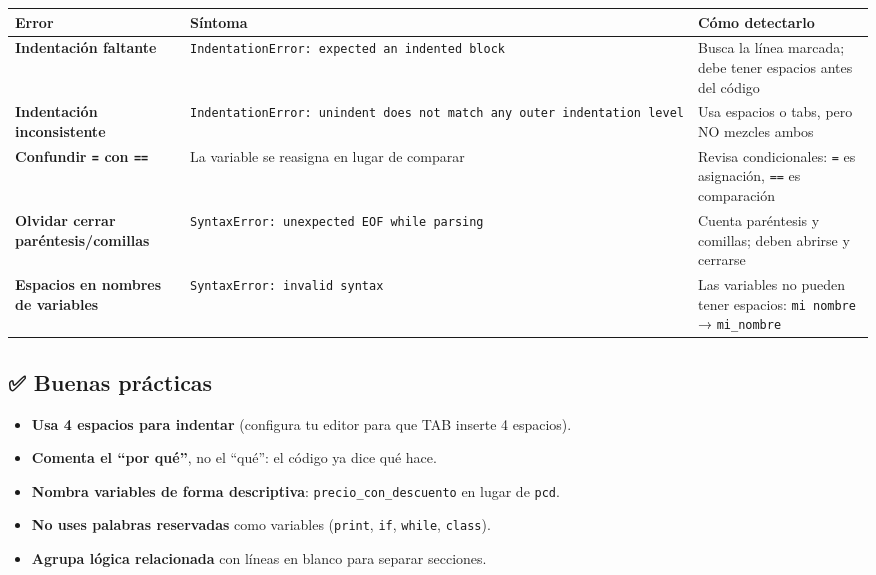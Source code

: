 \documentclass[
  doc,
  floatsintext,
  longtable,
  a4paper,
  nolmodern,
  notxfonts,
  notimes,
  12pt,
  colorlinks=true,linkcolor=blue,citecolor=blue,urlcolor=blue]{apa7}
\providecommand{\tightlist}{%
  \setlength{\itemsep}{0pt}\setlength{\parskip}{0pt}}
\newcounter{none} %
\begin{document}
{\def\LTcaptype{none} %
\begin{longtable}[]{@{}
  >{\raggedright\arraybackslash}p{}
  >{\raggedright\arraybackslash}p{}
  >{\raggedright\arraybackslash}p{}@{}}
\toprule\noalign{}
\begin{minipage}[b]{\linewidth}\raggedright
Error
\end{minipage} & \begin{minipage}[b]{\linewidth}\raggedright
Síntoma
\end{minipage} & \begin{minipage}[b]{\linewidth}\raggedright
Cómo detectarlo
\end{minipage} \\
\midrule\noalign{}
\endhead
\bottomrule\noalign{}
\endlastfoot
\textbf{Indentación faltante} &
\texttt{IndentationError:\ expected\ an\ indented\ block} & Busca la
línea marcada; debe tener espacios antes del código \\
\textbf{Indentación inconsistente} &
\texttt{IndentationError:\ unindent\ does\ not\ match\ any\ outer\ indentation\ level}
& Usa espacios o tabs, pero NO mezcles ambos \\
\textbf{Confundir \texttt{=} con \texttt{==}} & La variable se reasigna
en lugar de comparar & Revisa condicionales: \texttt{=} es asignación,
\texttt{==} es comparación \\
\textbf{Olvidar cerrar paréntesis/comillas} &
\texttt{SyntaxError:\ unexpected\ EOF\ while\ parsing} & Cuenta
paréntesis y comillas; deben abrirse y cerrarse \\
\textbf{Espacios en nombres de variables} &
\texttt{SyntaxError:\ invalid\ syntax} & Las variables no pueden tener
espacios: \texttt{mi\ nombre} → \texttt{mi\_nombre} \\
\end{longtable}
}

\subsection{✅ Buenas prácticas}\label{buenas-pruxe1cticas}

\begin{itemize}
\tightlist
\item
  \textbf{Usa 4 espacios para indentar} (configura tu editor para que
  TAB inserte 4 espacios).
\item
  \textbf{Comenta el ``por qué''}, no el ``qué'': el código ya dice qué
  hace.
\item
  \textbf{Nombra variables de forma descriptiva}:
  \texttt{precio\_con\_descuento} en lugar de \texttt{pcd}.
\item
  \textbf{No uses palabras reservadas} como variables (\texttt{print},
  \texttt{if}, \texttt{while}, \texttt{class}).
\item
  \textbf{Agrupa lógica relacionada} con líneas en blanco para separar
  secciones.
\end{itemize}
\end{document}
